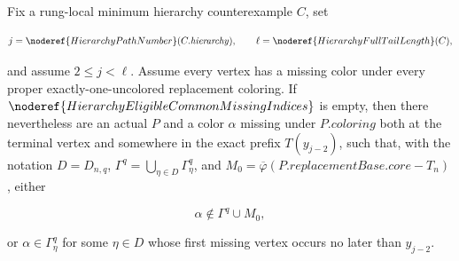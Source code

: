 \begin{lemma}
Fix a rung-local minimum hierarchy counterexample \(C\), set

\[
 j=\noderef{HierarchyPathNumber}(C.\mathit{hierarchy}),\qquad
 \ell=\noderef{HierarchyFullTailLength}(C),
\]

and assume \(2\le j<\ell\).  Assume every vertex has a missing color
under every proper exactly-one-uncolored replacement coloring.  If
\(\noderef{HierarchyEligibleCommonMissingIndices}\) is empty, then there
nevertheless are an actual
 \(P\) and a color \(\alpha\)
missing under \(P.\mathit{coloring}\) both at the terminal vertex and
somewhere in the exact prefix \(T(y_{j-2})\), such that, with the notation
\(D=D_{n,q}\), \(\Gamma^q=\bigcup_{\eta\in D}\Gamma^q_\eta\), and
\(M_0=\overline\varphi(P.\mathit{replacementBase}.\mathit{core}-T_n)\),
either

\[
                       \alpha\notin\Gamma^q\cup M_0,          \tag{A}
\]

or \(\alpha\in\Gamma^q_\eta\) for some \(\eta\in D\) whose first
missing vertex occurs no later than \(y_{j-2}\).
\end{lemma}
